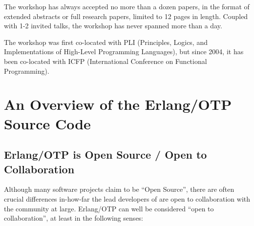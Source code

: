 The workshop has always accepted no more than a dozen papers, in the
format of extended abstracts or full research papers, limited to 12
pages in length.  Coupled with 1-2 invited talks, the workshop has
never spanned more than a day.

The workshop was first co-located with PLI (Principles, Logics, and
Implementations of High-Level Programming Languages), but since 2004,
it has been co-located with ICFP (International Conference on
Functional Programming).

\section{An Overview of the Erlang/OTP Source Code}
\label{app:overview-of-erlang-source}

\subsection{Erlang/OTP is Open Source / Open to Collaboration}

Although many software projects claim to be ``Open Source'', there are
often crucial differences in-how-far the lead developers of are open
to collaboration with the community at large. Erlang/OTP can well be
considered ``open to collaboration'', at least in the following
senses:

